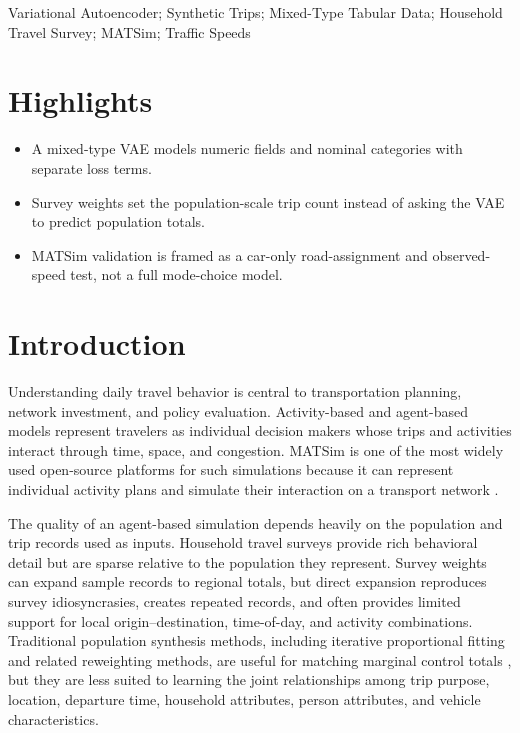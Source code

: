 \documentclass[3p,times,procedia]{elsarticle}
\begin{document}
\begin{frontmatter}
\begin{keyword}
Variational Autoencoder; Synthetic Trips; Mixed-Type Tabular Data; Household Travel Survey; MATSim; Traffic Speeds
\end{keyword}

\end{frontmatter}

\section*{Highlights}
\begin{itemize}
    \item A mixed-type VAE models numeric fields and nominal categories with separate loss terms.
    \item Survey weights set the population-scale trip count instead of asking the VAE to predict population totals.
    \item MATSim validation is framed as a car-only road-assignment and observed-speed test, not a full mode-choice model.
\end{itemize}

\newpage

\section{Introduction}
Understanding daily travel behavior is central to transportation planning, network investment, and policy evaluation. Activity-based and agent-based models represent travelers as individual decision makers whose trips and activities interact through time, space, and congestion. MATSim is one of the most widely used open-source platforms for such simulations because it can represent individual activity plans and simulate their interaction on a transport network \cite{horni2016matsim}.

The quality of an agent-based simulation depends heavily on the population and trip records used as inputs. Household travel surveys provide rich behavioral detail but are sparse relative to the population they represent. Survey weights can expand sample records to regional totals, but direct expansion reproduces survey idiosyncrasies, creates repeated records, and often provides limited support for local origin--destination, time-of-day, and activity combinations. Traditional population synthesis methods, including iterative proportional fitting and related reweighting methods, are useful for matching marginal control totals \cite{mueller2010synthetic}, but they are less suited to learning the joint relationships among trip purpose, location, departure time, household attributes, person attributes, and vehicle characteristics.
\end{document}
